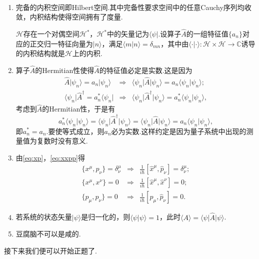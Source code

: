 		\begin{remark}\ 
			\begin{enumerate}
				\item 完备的内积空间即Hilbert空间.其中完备性要求空间中的任意Cauchy序列均收敛，内积结构使得空间拥有了度量.
				
				$\mathcal{H}$存在一个对偶空间$\mathcal{H}^*$，$\mathcal{H}^*$中的矢量记为$\langle\psi\vert$.设算子$\hat{A}$的一组特征值$\{a_n\}$对应的正交归一特征向量为$\vert n\rangle $，满足$\langle m\vert n\rangle=\delta_{mn}$，其中由$\langle\cdot \vert\cdot\rangle:\mathcal{H}\times \mathcal{H}\rightarrow \mathbb{C} $诱导的内积结构就是$\mathcal{H}$上的内积.
				\item 算子$\hat{A}$的Hermitian性使得$\hat{A}$的特征值必定是实数.这是因为
				\begin{eqnarray*}
					\hat{A}\vert\psi_n\rangle=a_n\vert\psi_n\rangle&\Rightarrow&\langle\psi_n\vert\hat{A}\vert\psi_n\rangle=a_n\langle\psi_n\vert\psi_n\rangle;\\
					\langle\psi_n\vert\hat{A}^\dagger=a^*_n\langle\psi_n\vert&\Rightarrow&\langle\psi_n\vert\hat{A}^\dagger\vert\psi_n\rangle=a^*_n\langle\psi_n\vert\psi_n\rangle,
				\end{eqnarray*}
				考虑到$\hat{A}$的Hermitian性，于是有
				$$a^*_n\langle\psi_n\vert\psi_n\rangle=\langle\psi_n\vert\hat{A}^\dagger\vert\psi_n\rangle=\langle\psi_n\vert\hat{A}\vert\psi_n\rangle=a_n\langle\psi_n\vert\psi_n\rangle,$$
				即$a^*_n=a_n$.要使等式成立，则$a_n$必为实数.这样约定是因为量子系统中出现的测量值为复数时没有意义.
				\item 由\ref{eq:xp}，\ref{eq:xxpp}得
				\begin{eqnarray*}
					\{x^\mu,p_\nu\}=\delta^\mu_\nu&\Rightarrow&\frac{1}{i\hbar}[\hat{x}^\mu,\hat{p}_\nu]=\delta^\mu_\nu;\\
					\{x^\mu,x^\nu\}=0&\Rightarrow&\frac{1}{i\hbar}[\hat{x}^\mu,\hat{x}^\nu]=0;\\
					\{p_\mu,p_\nu\}=0&\Rightarrow&\frac{1}{i\hbar}[\hat{p}_\mu,\hat{p}_\nu]=0.
				\end{eqnarray*}
				\item 若系统的状态矢量$\vert\psi\rangle$是归一化的，则$\langle\psi\vert\psi\rangle=1$，此时$\langle A\rangle =\langle\psi\vert\hat{A}\vert\psi\rangle$.
				\item 豆腐脑不可以是咸的.
			\end{enumerate}
		\end{remark}

		接下来我们便可以开始正题了.
